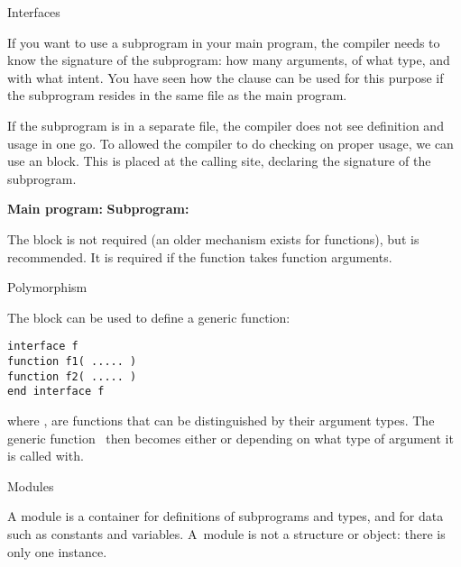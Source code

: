  {Interfaces}
\label{sec:finterface}

If you want to use a subprogram in your main program, the compiler
needs to know the signature of the subprogram: how many arguments, of
what type, and with what intent. You have seen how the
 clause can be used for this purpose if the
subprogram resides in the same file as the main program.

If the subprogram is in a separate file, the compiler does not see
definition and usage in one go. To allowed the compiler to do checking
on proper usage, we can use an  block. This
is placed at the calling site, declaring the signature of the
subprogram.

\begin{multicols}{2}
\textbf{Main program:}
\vfill\columnbreak
\textbf{Subprogram:}
\end{multicols}

The  block is not required (an older
 mechanism exists for functions), but is
recommended.
It is required if the function takes function arguments.

 {Polymorphism}

The  block can be used to define a generic
function:
\begin{verbatim}
interface f
function f1( ..... )
function f2( ..... )
end interface f
\end{verbatim}
where , are functions that can be distinguished by their
argument types. The generic function~ then becomes either 
or  depending on what type of argument it is called with.

 {Modules}
\label{sec:modulef}

A module is a container for definitions of subprograms and types, and
for data such as constants and variables. A~module is not a 
structure or object: there is only one instance.

